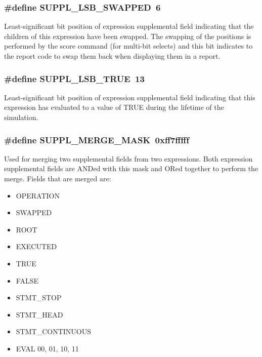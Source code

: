 \subsubsection{\setlength{\rightskip}{0pt plus 5cm}\#define SUPPL\_\-LSB\_\-SWAPPED\ 6}\label{group__expr__suppl_a1}


Least-significant bit position of expression supplemental field indicating that the children of this expression have been swapped. The swapping of the positions is performed by the score command (for multi-bit selects) and this bit indicates to the report code to swap them back when displaying them in a report. 
\subsubsection{\setlength{\rightskip}{0pt plus 5cm}\#define SUPPL\_\-LSB\_\-TRUE\ 13}\label{group__expr__suppl_a8}


Least-significant bit position of expression supplemental field indicating that this expression has evaluated to a value of TRUE during the lifetime of the simulation. 
\subsubsection{\setlength{\rightskip}{0pt plus 5cm}\#define SUPPL\_\-MERGE\_\-MASK\ 0xff7fffff}\label{group__expr__suppl_a19}


Used for merging two supplemental fields from two expressions. Both expression supplemental fields are ANDed with this mask and ORed together to perform the merge. Fields that are merged are:\begin{itemize}
\item OPERATION\item SWAPPED\item ROOT\item EXECUTED\item TRUE\item FALSE\item STMT\_\-STOP\item STMT\_\-HEAD\item STMT\_\-CONTINUOUS\item EVAL 00, 01, 10, 11 \end{itemize}

